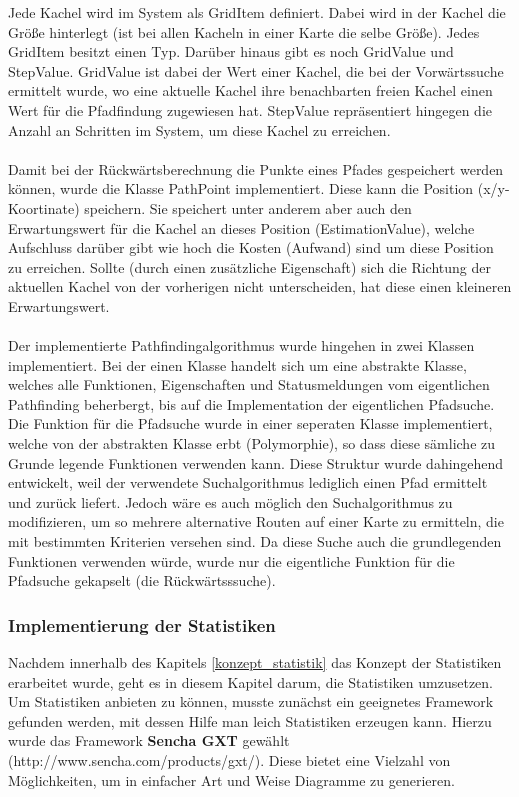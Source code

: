 Jede Kachel wird im System als GridItem definiert. Dabei wird in der Kachel die Größe hinterlegt (ist bei allen Kacheln in einer Karte die selbe Größe). Jedes GridItem besitzt einen Typ. Darüber hinaus gibt es noch GridValue und StepValue. GridValue ist dabei der Wert einer Kachel, die bei der Vorwärtssuche ermittelt wurde, wo eine aktuelle Kachel ihre benachbarten freien Kachel einen Wert für die Pfadfindung zugewiesen hat. StepValue repräsentiert hingegen die Anzahl an Schritten im System, um diese Kachel zu erreichen.
\\\\
Damit bei der Rückwärtsberechnung die Punkte eines Pfades gespeichert werden können, wurde die Klasse PathPoint implementiert. Diese kann die Position (x/y-Koortinate) speichern. Sie speichert unter anderem aber auch den Erwartungswert für die Kachel an dieses Position (EstimationValue), welche Aufschluss darüber gibt wie hoch die Kosten (Aufwand) sind um diese Position zu erreichen. Sollte (durch einen zusätzliche Eigenschaft) sich die Richtung der aktuellen Kachel von der vorherigen nicht unterscheiden, hat diese einen kleineren Erwartungswert.
\\\\
Der implementierte Pathfindingalgorithmus wurde hingehen in zwei Klassen implementiert. Bei der einen Klasse handelt sich um eine abstrakte Klasse, welches alle Funktionen, Eigenschaften und Statusmeldungen vom eigentlichen Pathfinding beherbergt, bis auf die Implementation der eigentlichen Pfadsuche. Die Funktion für die Pfadsuche wurde in einer seperaten Klasse implementiert, welche von der abstrakten Klasse erbt (Polymorphie), so dass diese sämliche zu Grunde legende Funktionen verwenden kann. Diese Struktur wurde dahingehend entwickelt, weil der verwendete Suchalgorithmus lediglich einen Pfad ermittelt und zurück liefert. Jedoch wäre es auch möglich den Suchalgorithmus zu modifizieren, um so mehrere alternative Routen auf einer Karte zu ermitteln, die mit bestimmten Kriterien versehen sind. Da diese Suche auch die grundlegenden Funktionen verwenden würde, wurde nur die eigentliche Funktion für die Pfadsuche gekapselt (die Rückwärtsssuche).

\subsubsection{Implementierung der Statistiken}
Nachdem innerhalb des Kapitels \ref{konzept_statistik} das Konzept der Statistiken erarbeitet wurde, geht es in diesem Kapitel darum, die Statistiken umzusetzen. Um Statistiken anbieten zu können, musste zunächst ein geeignetes Framework gefunden werden, mit dessen Hilfe man leich Statistiken erzeugen kann. Hierzu wurde das Framework \textbf{Sencha GXT} gewählt (http://www.sencha.com/products/gxt/). Diese bietet eine Vielzahl von Möglichkeiten, um in einfacher Art und Weise Diagramme zu generieren.

